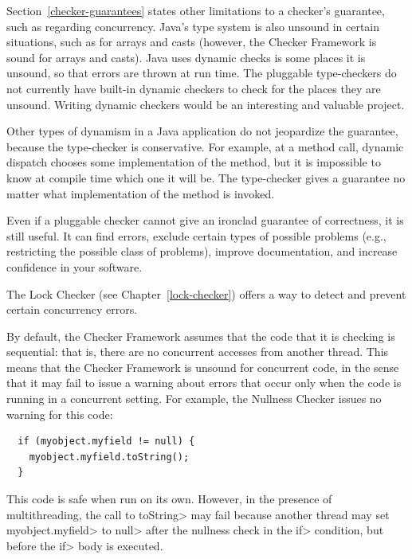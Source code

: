 Section~\ref{checker-guarantees} states other limitations to a checker's
guarantee, such as regarding concurrency.  Java's type system is also
unsound in certain situations, such as for arrays and casts (however, the
Checker Framework is sound for arrays and casts).  Java uses dynamic checks
is some places it is unsound, so that errors are thrown at run time.  The
pluggable type-checkers do not currently have built-in dynamic checkers to
check for the places they are unsound.
Writing dynamic checkers would be an interesting and valuable project.

Other types of dynamism in a Java application do not jeopardize the
guarantee, because the type-checker is conservative.  For example, at a
method call, dynamic dispatch chooses some implementation of the method,
but it is impossible to know at compile time which one it will be.  The
type-checker gives a guarantee no matter what implementation of the method
is invoked.


Even if a pluggable checker cannot give an ironclad
guarantee of correctness, it is still useful.  It can find errors,
exclude certain types of possible problems (e.g., restricting the
possible class of problems), improve documentation, and increase confidence
in your software.



The Lock Checker (see Chapter~\ref{lock-checker}) offers a way to detect
and prevent certain concurrency errors.


By default, the Checker Framework assumes that the code that it is checking
is sequential:  that is, there are no concurrent accesses from another
thread.  This means that the Checker Framework is unsound for concurrent
code, in the sense that it may fail to issue a warning about errors that
occur only when the code is running in a concurrent setting.
For example, the Nullness Checker issues no warning for this
code:

\begin{Verbatim}
  if (myobject.myfield != null) {
    myobject.myfield.toString();
  }
\end{Verbatim}

\noindent
This code is safe when run on its own.
However, in the presence of multithreading, the call to \<toString> may
fail because another thread may set \<myobject.myfield> to \<null> after
the nullness check in the \<if> condition, but before the \<if> body is
executed.

